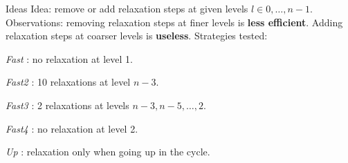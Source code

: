 \documentclass{beamer}
\begin{document}
\begin{frame}{Ideas}
  Idea: remove or add relaxation steps at given levels $l \in 0,\dots,n-1$.\\
  Observations: removing relaxation steps at finer levels is \textbf{less efficient}. Adding relaxation steps at coarser levels is \textbf{useless}.
  Strategies tested:\\
  \begin{itemize}
   \item {\color{mygray}\emph{Fast} : no relaxation at level 1.
   \item \emph{Fast2} : 10 relaxations at level $n-3$.
   \item \emph{Fast3} : 2 relaxations at levels $n-3,n-5,\dots,2$.}
   \item \emph{Fast4} : no relaxation at level 2.
   \item \emph{Up} : relaxation only when going up in the cycle.
  \end{itemize}
 \end{frame}
\end{document}
